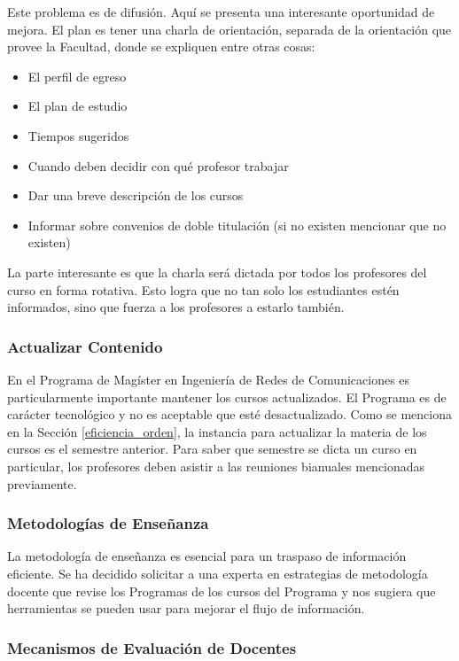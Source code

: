 Este problema es de difusión. Aquí se presenta una interesante oportunidad de mejora. El plan es tener una charla de orientación, separada de la 
orientación que provee la Facultad, donde se expliquen entre otras cosas:

\begin{itemize}
\item El perfil de egreso
\item El plan de estudio
\item Tiempos sugeridos
\item Cuando deben decidir con qué profesor trabajar
\item Dar una breve descripción de los cursos
\item Informar sobre convenios de doble titulación (si no existen mencionar que no existen)
\end{itemize}

La parte interesante es que la charla será dictada por todos los profesores del curso en forma rotativa. Esto logra que no tan solo los estudiantes 
estén informados, sino que fuerza a los profesores a estarlo también.


\subsubsection{Actualizar Contenido}

En el Programa de Magíster en Ingeniería de Redes de Comunicaciones es particularmente importante mantener los cursos actualizados. El Programa es de carácter tecnológico y no 
es aceptable que esté desactualizado. Como se menciona en la Sección \ref{eficiencia_orden}, la instancia para actualizar la materia de los cursos 
es el semestre anterior. Para saber que semestre se dicta un curso en particular, los profesores deben asistir a las reuniones bianuales mencionadas previamente.

\subsubsection{Metodologías de Enseñanza}

La metodología de enseñanza es esencial para un traspaso de información eficiente. Se ha decidido solicitar a una experta en estrategias de metodología docente que revise los Programas de los cursos del Programa y nos sugiera que herramientas 
se pueden usar para mejorar el flujo de información. 

\subsubsection{Mecanismos de Evaluación de Docentes}

